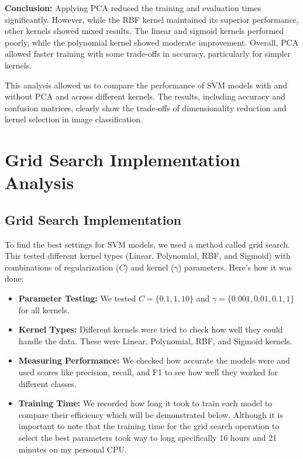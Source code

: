 \documentclass[lettersize,journal]{IEEEtran}
\begin{document}
\textbf{Conclusion:}  
Applying PCA reduced the training and evaluation times significantly. However, while the RBF kernel maintained its superior performance, other kernels showed mixed results. The linear and sigmoid kernels performed poorly, while the polynomial kernel showed moderate improvement. Overall, PCA allowed faster training with some trade-offs in accuracy, particularly for simpler kernels.

This analysis allowed us to compare the performance of SVM models with and without PCA and across different kernels. The results, including accuracy and confusion matrices, clearly show the trade-offs of dimensionality reduction and kernel selection in image classification.

\section{\textbf{Grid Search Implementation Analysis}}

\subsection{\textbf{Grid Search Implementation}}
To find the best settings for SVM models, we used a method called grid search. This tested different kernel types (Linear, Polynomial, RBF, and Sigmoid) with combinations of regularization ($C$) and kernel ($\gamma$) parameters. Here’s how it was done:

\begin{itemize}
    \item \textbf{Parameter Testing:} We tested $C = \{0.1, 1, 10\}$ and $\gamma = \{0.001, 0.01, 0.1, 1\}$ for all kernels.
    \item \textbf{Kernel Types:} Different kernels were tried to check how well they could handle the data. These were Linear, Polynomial, RBF, and Sigmoid kernels.
    \item \textbf{Measuring Performance:} We checked how accurate the models were and used scores like precision, recall, and F1 to see how well they worked for different classes.
    \item \textbf{Training Time:} We recorded how long it took to train each model to compare their efficiency which will be demonstrated below. Although it is important to note that the training time for the grid search operation to select the best parameters took way to long specifically 16 hours and 21 minutes on my personal CPU.
\end{itemize}
\end{document}
